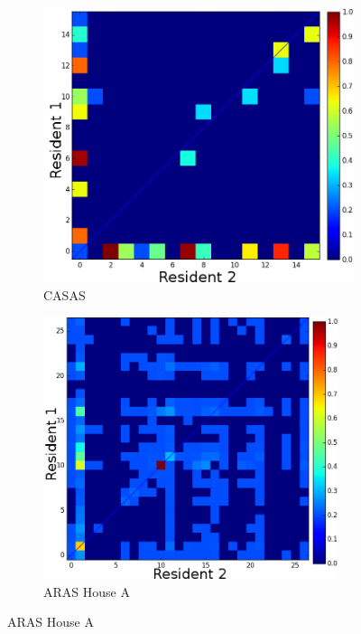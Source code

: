 \begin{figure}[hpt]
  \centering
  \begin{subfigure}{0.32\textwidth}
    \includegraphics[width=.95\textwidth]{casas_act_fusion.png}
    \caption{CASAS}
    \label{fig:casas_viz}
  \end{subfigure}
  \begin{subfigure}{0.32\textwidth}
    \includegraphics[width=0.95\textwidth]{aras_a_acts_fusion.png}
    \caption{ARAS House A}
    \label{fig:aras_a_viz}
  \end{subfigure}

\end{figure}
